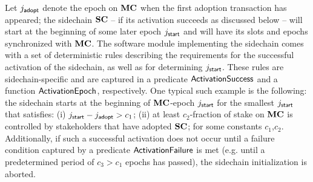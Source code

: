 Let $j_{\mathsf{adopt}}$ denote the epoch on $\mathbf{MC}$ when the first adoption transaction has
appeared; the sidechain $\mathbf{SC}$ -- if its activation succeeds as discussed
below -- will start at the beginning of some later epoch $j_{\mathsf{start}}$ and will have
its slots and epochs synchronized with $\mathbf{MC}$.
The software module implementing the sidechain comes with a set of
deterministic rules describing the requirements for the successful activation of
the sidechain, as well as for determining $j_{\mathsf{start}}$.
These rules are sidechain-specific and are captured in a predicate
$\mathsf{ActivationSuccess}$ and a function $\mathsf{ActivationEpoch}$, respectively.
One typical such example is the following:
the sidechain starts at the beginning of $\mathbf{MC}$-epoch $j_{\mathsf{start}}$ for the smallest
$j_{\mathsf{start}}$ that satisfies:
    (i)  $j_{\mathsf{start}} - j_{\mathsf{adopt}} > c_1$;
    (ii) at least $c_2$-fraction of stake on $\mathbf{MC}$ is controlled by stakeholders that
    have adopted $\mathbf{SC}$;
for some constants $c_1$,$c_2$. Additionally, if such a successful activation
does not occur until a failure condition captured by a predicate
$\mathsf{ActivationFailure}$ is met (e.g. until a predetermined period of $c_3>c_1$ epochs has
passed), the sidechain initialization is aborted.

